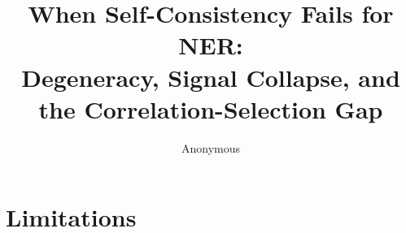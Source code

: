 \documentclass[11pt]{article}
\title{When Self-Consistency Fails for NER:\\ Degeneracy, Signal Collapse, and the Correlation-Selection Gap}
\author{Anonymous}
\begin{document}
\maketitle










\section*{Limitations}




\appendix
\renewcommand{\thesection}{\alphalph{\value{section}}}

\end{document}
